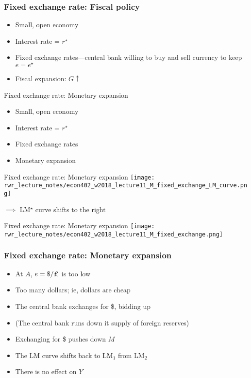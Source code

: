 \documentclass[presentation,dvipsnames]{beamer}
\renewcommand{\pounds}{\text{\textsterling}{ }}
\begin{document}
\begin{frame}
\frametitle{Fixed exchange rate: Fiscal policy}
\begin{itemize}[label={--}]
\item Small, open economy
\item Interest rate = $r^{\star}$
\item Fixed exchange rates---central bank willing to buy and sell currency to keep $e = e^{\star}$
\item Fiscal expansion: $G \uparrow$
\end{itemize}
\end{frame}

\begin{frame}[label=sec-6-2]{Fixed exchange rate: Monetary expansion}
\begin{itemize}[label={--}]
\item Small, open economy
\item Interest rate = $r^{\star}$
\item Fixed exchange rates
\item Monetary expansion
\end{itemize}
\end{frame}
\begin{frame}[label=sec-6-2]{Fixed exchange rate: Monetary expansion}
\texttt{[image: rwr\_lecture\_notes/econ402\_w2018\_lecture11\_M\_fixed\_exchange\_LM\_curve.png]}

$\implies$ LM$^{\star}$ curve shifts to the right

\end{frame}
\begin{frame}[label=sec-6-2]{Fixed exchange rate: Monetary expansion}
\texttt{[image: rwr\_lecture\_notes/econ402\_w2018\_lecture11\_M\_fixed\_exchange.png]}
\end{frame}
\begin{frame}
\frametitle{Fixed exchange rate: Monetary expansion}
\begin{itemize}[label={--}]
\item At $A$, $e = \$ / \pounds$ is too low
\item Too many dollars; ie, dollars are cheap
\item The central bank exchanges \pounds for \$, bidding up \pounds
\item (The central bank runs down it supply of foreign reserves)
\item Exchanging \pounds for \$ pushes down $M$
\item The LM curve shifts back to LM$_{1}$ from LM$_{2}$
\item \textcolor{RubineRed}{There is no effect on $Y$}
\end{itemize}
\end{frame}
\end{document}
